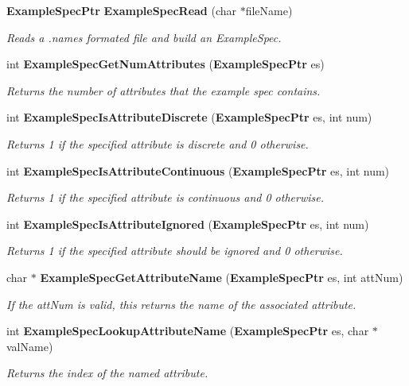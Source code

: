 \begin{CompactItemize}
{\bf Example\-Spec\-Ptr} {\bf Example\-Spec\-Read} (char $\ast$file\-Name)
\begin{CompactList}\small\item\em Reads a .names formated file and build an Example\-Spec. \item\end{CompactList}\item 
int {\bf Example\-Spec\-Get\-Num\-Attributes} ({\bf Example\-Spec\-Ptr} es)
\begin{CompactList}\small\item\em Returns the number of attributes that the example spec contains. \item\end{CompactList}\item 
int {\bf Example\-Spec\-Is\-Attribute\-Discrete} ({\bf Example\-Spec\-Ptr} es, int num)
\begin{CompactList}\small\item\em Returns 1 if the specified attribute is discrete and 0 otherwise. \item\end{CompactList}\item 
int {\bf Example\-Spec\-Is\-Attribute\-Continuous} ({\bf Example\-Spec\-Ptr} es, int num)
\begin{CompactList}\small\item\em Returns 1 if the specified attribute is continuous and 0 otherwise. \item\end{CompactList}\item 
int {\bf Example\-Spec\-Is\-Attribute\-Ignored} ({\bf Example\-Spec\-Ptr} es, int num)
\begin{CompactList}\small\item\em Returns 1 if the specified attribute should be ignored and 0 otherwise. \item\end{CompactList}\item 
char $\ast$ {\bf Example\-Spec\-Get\-Attribute\-Name} ({\bf Example\-Spec\-Ptr} es, int att\-Num)
\begin{CompactList}\small\item\em If the att\-Num is valid, this returns the name of the associated attribute. \item\end{CompactList}\item 
int {\bf Example\-Spec\-Lookup\-Attribute\-Name} ({\bf Example\-Spec\-Ptr} es, char $\ast$val\-Name)
\begin{CompactList}\small\item\em Returns the index of the named attribute. \item\end{CompactList}\item 

\end{CompactItemize}
